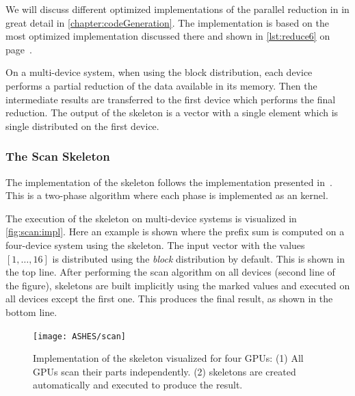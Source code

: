 We will discuss different optimized implementations of the parallel reduction in \OpenCL in great detail in \autoref{chapter:codeGeneration}.
The \SkelCL implementation is based on the most optimized implementation discussed there and shown in \autoref{lst:reduce6} on page~\pageref{lst:reduce6}.

On a multi-device system, when using the block distribution, each device performs a partial reduction of the data available in its memory.
Then the intermediate results are transferred to the first device which performs the final reduction.
The output of the \reduce skeleton is a vector with a single element which is single distributed on the first device.





\subsubsection{The Scan Skeleton}
The implementation of the \scan skeleton follows the implementation presented in~\cite{HarrisSeOw2007}.
This is a two-phase algorithm where each phase is implemented as an \OpenCL kernel.

The execution of the \scan skeleton on multi-device systems is visualized in \autoref{fig:scan:impl}.
Here an example is shown where the prefix sum is computed on a four-device system using the \scan skeleton.
The input vector with the values $[1,\ldots,16]$ is distributed using the \emph{block} distribution by default.
This is shown in the top line.
After performing the scan algorithm on all devices (second line of the figure), \map skeletons are built implicitly using the marked values and executed on all devices except the first one.
This produces the final result, as shown in the bottom line.

\begin{figure}[tbp]
    \centering
    \texttt{[image: ASHES/scan]}
    \caption[Implementation of the \scan skeleton.]%
            {Implementation of the \scan skeleton visualized for four GPUs:
            (1) All GPUs scan their parts independently.
            (2) \map skeletons are created automatically and
             executed to produce the result.}
    \label{fig:scan:impl}
\end{figure}

